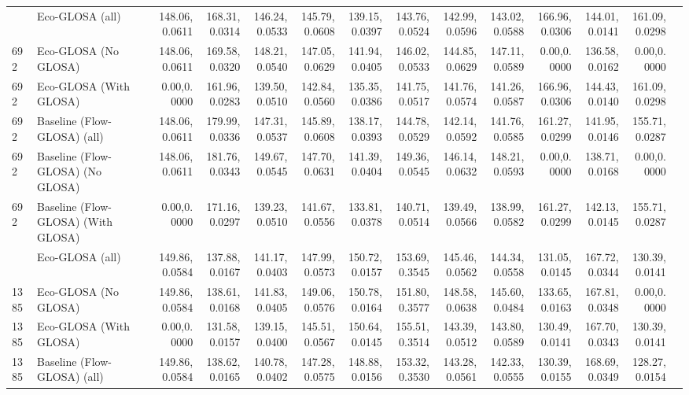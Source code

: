 \begin{table}[ht]
{\begin{tabular}{llrrrrrrrrrrrr}
        \addlinespace
        692  & Eco-GLOSA (all)                    & 148.06,0.0611 & 168.31,0.0314 & 146.24,0.0533 & 145.79,0.0608 & 139.15,0.0397 & 143.76,0.0524 & 142.99,0.0596 & 143.02,0.0588 & 166.96,0.0306 & 144.01,0.0141 & 161.09,0.0298 \\
        692  & Eco-GLOSA (No GLOSA)               & 148.06,0.0611 & 169.58,0.0320 & 148.21,0.0540 & 147.05,0.0629 & 141.94,0.0405 & 146.02,0.0533 & 144.85,0.0629 & 147.11,0.0589 & 0.00,0.0000   & 136.58,0.0162 & 0.00,0.0000   \\
        692  & Eco-GLOSA (With GLOSA)             & 0.00,0.0000   & 161.96,0.0283 & 139.50,0.0510 & 142.84,0.0560 & 135.35,0.0386 & 141.75,0.0517 & 141.76,0.0574 & 141.26,0.0587 & 166.96,0.0306 & 144.43,0.0140 & 161.09,0.0298 \\
        692  & Baseline (Flow-GLOSA) (all)        & 148.06,0.0611 & 179.99,0.0336 & 147.31,0.0537 & 145.89,0.0608 & 138.17,0.0393 & 144.78,0.0529 & 142.14,0.0592 & 141.76,0.0585 & 161.27,0.0299 & 141.95,0.0146 & 155.71,0.0287 \\
        692  & Baseline (Flow-GLOSA) (No GLOSA)   & 148.06,0.0611 & 181.76,0.0343 & 149.67,0.0545 & 147.70,0.0631 & 141.39,0.0404 & 149.36,0.0545 & 146.14,0.0632 & 148.21,0.0593 & 0.00,0.0000   & 138.71,0.0168 & 0.00,0.0000   \\
        692  & Baseline (Flow-GLOSA) (With GLOSA) & 0.00,0.0000   & 171.16,0.0297 & 139.23,0.0510 & 141.67,0.0556 & 133.81,0.0378 & 140.71,0.0514 & 139.49,0.0566 & 138.99,0.0582 & 161.27,0.0299 & 142.13,0.0145 & 155.71,0.0287 \\
        \addlinespace
        1385 & Eco-GLOSA (all)                    & 149.86,0.0584 & 137.88,0.0167 & 141.17,0.0403 & 147.99,0.0573 & 150.72,0.0157 & 153.69,0.3545 & 145.46,0.0562 & 144.34,0.0558 & 131.05,0.0145 & 167.72,0.0344 & 130.39,0.0141 \\
        1385 & Eco-GLOSA (No GLOSA)               & 149.86,0.0584 & 138.61,0.0168 & 141.83,0.0405 & 149.06,0.0576 & 150.78,0.0164 & 151.80,0.3577 & 148.58,0.0638 & 145.60,0.0484 & 133.65,0.0163 & 167.81,0.0348 & 0.00,0.0000   \\
        1385 & Eco-GLOSA (With GLOSA)             & 0.00,0.0000   & 131.58,0.0157 & 139.15,0.0400 & 145.51,0.0567 & 150.64,0.0145 & 155.51,0.3514 & 143.39,0.0512 & 143.80,0.0589 & 130.49,0.0141 & 167.70,0.0343 & 130.39,0.0141 \\
        1385 & Baseline (Flow-GLOSA) (all)        & 149.86,0.0584 & 138.62,0.0165 & 140.78,0.0402 & 147.28,0.0575 & 148.88,0.0156 & 153.32,0.3530 & 143.28,0.0561 & 142.33,0.0555 & 130.39,0.0155 & 168.69,0.0349 & 128.27,0.0154 \\

\end{tabular}}
\end{table}
